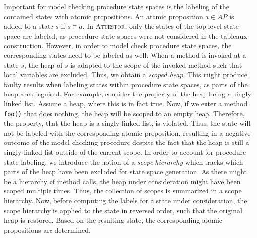 \documentclass[a4paper, 12pt, twoside]{report}
\begin{document}
	Important for model checking procedure state spaces is the labeling of the contained states with atomic propositions. An atomic proposition $a \in AP$ is added to a state $s$ if $s \models a$. In \textsc{Attestor}, only the states of the top-level state space are labeled, as procedure state spaces were not considered in the tableaux construction. However, in order to model check procedure state spaces, the corresponding states need to be labeled as well. When a method is invoked at a state $s$, the heap of $s$ is adapted to the scope of the invoked method such that local variables are excluded. Thus, we obtain a \textit{scoped heap}. This might produce faulty results when labeling states within procedure state spaces, as parts of the heap are disguised. For example, consider the property of the heap being a singly-linked list. Assume a heap, where this is in fact true. Now, if we enter a method \texttt{foo()} that does nothing, the heap will be scoped to an empty heap. Therefore, the property, that the heap is a singly-linked list, is violated. Thus, the state will not be labeled with the corresponding atomic proposition, resulting in a negative outcome of the model checking procedure despite the fact that the heap is still a singly-linked list outside of the current scope. In order to account for procedure state labeling, we introduce the notion of a \textit{scope hierarchy} which tracks which parts of the heap have been excluded for state space generation. As there might be a hierarchy of method calls, the heap under consideration might have been scoped multiple times. Thus, the collection of scopes is summarized in a scope hierarchy. Now, before computing the labels for a state under consideration, the scope hierarchy is applied to the state in reversed order, such that the original heap is restored. Based on the resulting state, the corresponding atomic propositions are determined.\\
	
\end{document}
